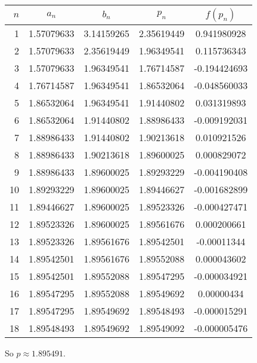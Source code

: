 \documentclass[../../Assignments.tex]{subfiles}
\begin{document}
\begin{solution}
\begin{enumerate}[label=(\alph*)]
            \begin{longtable}{r S[table-format=1.8] S[table-format=1.8] S[table-format=1.8] S[table-format=-1.9]}
                \toprule
                \(n\)  &   {\(a_n\)}   &   {\(b_n\)}   &   {\(p_n\)}   &  {\(f(p_n)\)}  \\
                  &  1.57079633   &  3.14159265   &  2.35619449   &   0.941980928  \\
                    2  &  1.57079633   &  2.35619449   &  1.96349541   &   0.115736343  \\
                    3  &  1.57079633   &  1.96349541   &  1.76714587   &  -0.194424693  \\
                    4  &  1.76714587   &  1.96349541   &  1.86532064   &  -0.048560033  \\
                    5  &  1.86532064   &  1.96349541   &  1.91440802   &   0.031319893  \\
                    6  &  1.86532064   &  1.91440802   &  1.88986433   &  -0.009192031  \\
                    7  &  1.88986433   &  1.91440802   &  1.90213618   &   0.010921526  \\
                    8  &  1.88986433   &  1.90213618   &  1.89600025   &   0.000829072  \\
                    9  &  1.88986433   &  1.89600025   &  1.89293229   &  -0.004190408  \\
                   10  &  1.89293229   &  1.89600025   &  1.89446627   &  -0.001682899  \\
                   11  &  1.89446627   &  1.89600025   &  1.89523326   &  -0.000427471  \\
                   12  &  1.89523326   &  1.89600025   &  1.89561676   &   0.000200661  \\
                   13  &  1.89523326   &  1.89561676   &  1.89542501   &  -0.00011344   \\
                   14  &  1.89542501   &  1.89561676   &  1.89552088   &   0.000043602  \\
                   15  &  1.89542501   &  1.89552088   &  1.89547295   &  -0.000034921  \\
                   16  &  1.89547295   &  1.89552088   &  1.89549692   &   0.00000434   \\
                   17  &  1.89547295   &  1.89549692   &  1.89548493   &  -0.000015291  \\
                   18  &  1.89548493   &  1.89549692   &  1.89549092   &  -0.000005476  \\
                \bottomrule
            \end{longtable}

            So \(p \approx \num{1.895491}\).
    \end{enumerate}
\end{solution}
\end{document}
